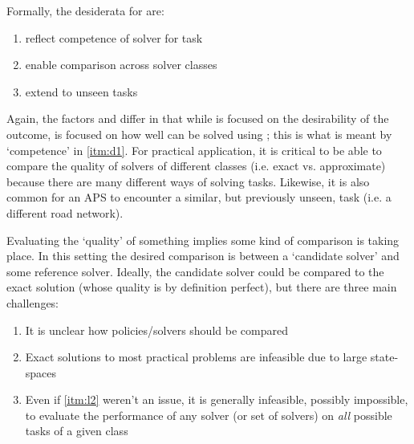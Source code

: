     Formally, the desiderata for \xQ{} are:
    
    \begin{enumerate}[label=\textbf{D\arabic*}]
        \item reflect competence of solver \solve{} for task \task{} \label{itm:d1}
        \item enable comparison across solver classes \label{itm:d2}
        \item extend to unseen tasks \label{itm:d3}
    \end{enumerate}
    
    Again, the factors \xO{} and \xQ{} differ in that while \xO{} is focused on the desirability of the outcome, \xQ{} is focused on how well \task{} can be solved using \solve; this is what is meant by `competence' in \ref{itm:d1}. For practical application, it is critical to be able to compare the quality of solvers of different classes (i.e. exact vs. approximate) because there are many different ways of solving tasks. Likewise, it is also common for an APS to encounter a similar, but previously unseen, task (i.e. a different road network).
    
    Evaluating the `quality' of something implies some kind of comparison is taking place. In this setting the desired comparison is between a `candidate solver' \solve{} and some reference solver. Ideally, the candidate solver could be compared to the exact solution (whose quality is by definition perfect), but there are three main challenges:

    \begin{enumerate}[label=\textbf{C\arabic*}]
        \item It is unclear how policies/solvers should be compared \label{itm:l1}
        \item Exact solutions to most practical problems are infeasible due to large state-spaces \label{itm:l2}
        \item Even if \ref{itm:l2} weren't an issue, it is generally infeasible, possibly impossible, to evaluate the performance of any solver (or set of solvers) on \emph{all} possible tasks \label{itm:l3} of a given class
    \end{enumerate}

